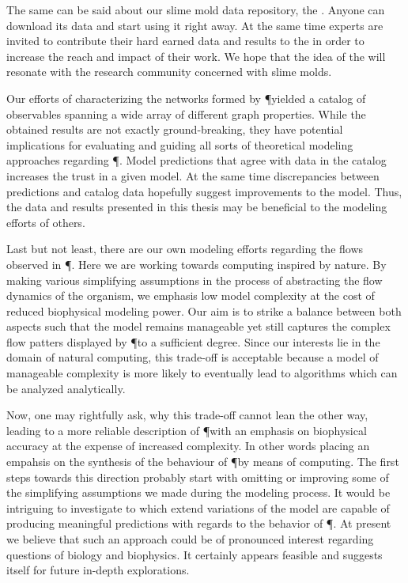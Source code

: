 	The same can be said about our slime mold data repository, the \SMGR. Anyone can download its data and start using it right away. At the same time experts are invited to contribute their hard earned data and results to the \SMGR in order to increase the reach and impact of their work. We hope that the idea of the \SMGR will resonate with the research community concerned with slime molds.

	Our efforts of characterizing the networks formed by \P yielded a catalog of observables spanning a wide array of different graph properties. While the obtained results are not exactly ground-breaking, they have potential implications for evaluating and guiding all sorts of theoretical modeling approaches regarding \P. Model predictions that agree with data in the catalog increases the trust in a given model. At the same time discrepancies between predictions and catalog data hopefully suggest improvements to the model. Thus, the data and results presented in this thesis may be beneficial to the modeling efforts of others.

	Last but not least, there are our own modeling efforts regarding the flows observed in \P. Here we are working towards computing inspired by nature. By making various simplifying assumptions in the process of abstracting the flow dynamics of the organism, we emphasis low model complexity at the cost of reduced biophysical modeling power. Our aim is to strike a balance between both aspects such that the model remains manageable yet still captures the complex flow patters displayed by \P to a sufficient degree. Since our interests lie in the domain of natural computing, this trade-off is acceptable because a model of manageable complexity is more likely to eventually lead to algorithms which can be analyzed analytically. 

	Now, one may rightfully ask, why this trade-off cannot lean the other way, leading to a more reliable description of \P with an emphasis on biophysical accuracy at the expense of increased complexity. In other words placing an empahsis on the synthesis of the behaviour of \P by means of computing. The first steps towards this direction probably start with omitting or improving some of the simplifying assumptions we made during the modeling process. It would be intriguing to investigate to which extend variations of the model are capable of producing meaningful predictions with regards to the behavior of \P. At present we believe that such an approach could be of pronounced interest regarding questions of biology and biophysics. It certainly appears feasible and suggests itself for future in-depth explorations.

